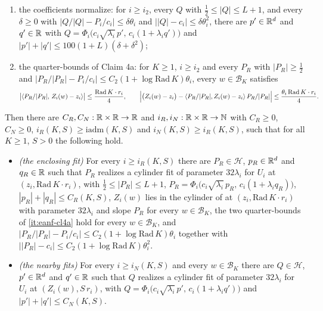 \begin{lemma}
\begin{enumerate}
$0<\rho\le\mathrm{Mof}(K,S)\,r_i$ there is $Q$ realizing a cylinder fit of
parameter $32\lambda_i$ for $U_i$ at $(Z_i(w),\rho)$ with
$\tfrac12\le|Q|\le L+1$;
\item\label{it:eanf-coeff} the coefficients normalize: for $i\ge i_2$, every
$Q$ with $\tfrac12\le|Q|\le L+1$, and every $\delta\ge0$ with
$\bigl|Q/|Q|-P_i/c_i\bigr|\le\delta\theta_i$ and
$\bigl||Q|-c_i\bigr|\le\delta\theta_i^2$, there are $p'\in\mathbb{R}^d$ and $q'\in\mathbb{R}$
with
$Q=\Phi_i\bigl(c_i\sqrt{\lambda_i}\,p',\,c_i(1+\lambda_iq')\bigr)$ and
$|p'|+|q'|\le100(1+L)(\delta+\delta^2)$;
\item\label{it:eanf-cl4a} the quarter-bounds of Claim 4a: for $K\ge1$,
$i\ge i_2$ and every $P_R$ with $|P_R|\ge\tfrac12$ and
$\bigl|P_R/|P_R|-P_i/c_i\bigr|\le C_2(1+\log\mathrm{Rad}\,K)\theta_i$, every
$w\in\mathcal B_K$ satisfies
\[
  \bigl|\langle P_R/|P_R|,\,Z_i(w)-z_i\rangle\bigr|
    \le\frac{\mathrm{Rad}\,K\cdot r_i}{4},
  \qquad
  \Bigl|\bigl(Z_i(w)-z_i\bigr)
    -\langle P_R/|P_R|,Z_i(w)-z_i\rangle\,P_R/|P_R|\Bigr|
    \le\frac{\theta_i\,\mathrm{Rad}\,K\cdot r_i}{4}.
\]
\end{enumerate}
Then there are $C_R,C_N:\mathbb{R}\times\mathbb{R}\to\mathbb{R}$ and
$i_R,i_N:\mathbb{R}\times\mathbb{R}\to\mathbb{N}$ with $C_R\ge0$, $C_N\ge0$,
$i_R(K,S)\ge\mathrm{iadm}(K,S)$ and $i_N(K,S)\ge i_R(K,S)$, such that for all
$K\ge1$, $S>0$ the following hold.
\begin{itemize}
\item\emph{(the enclosing fit)} For every $i\ge i_R(K,S)$ there are
$P_R\in\mathcal H$, $p_R\in\mathbb{R}^d$ and $q_R\in\mathbb{R}$ such that $P_R$ realizes a
cylinder fit of parameter $32\lambda_i$ for $U_i$ at
$(z_i,\mathrm{Rad}\,K\cdot r_i)$, with $\tfrac12\le|P_R|\le L+1$,
$P_R=\Phi_i\bigl(c_i\sqrt{\lambda_i}\,p_R,\,c_i(1+\lambda_iq_R)\bigr)$,
$|p_R|+|q_R|\le C_R(K,S)$, $Z_i(w)$ lies in the cylinder of
 at $(z_i,\mathrm{Rad}\,K\cdot r_i)$ with parameter
$32\lambda_i$ and slope $P_R$ for every $w\in\mathcal B_K$, the two
quarter-bounds of \ref{it:eanf-cl4a} hold for every $w\in\mathcal B_K$, and
$\bigl|P_R/|P_R|-P_i/c_i\bigr|\le C_2(1+\log\mathrm{Rad}\,K)\theta_i$ together
with $\bigl||P_R|-c_i\bigr|\le C_2(1+\log\mathrm{Rad}\,K)\theta_i^2$.
\item\emph{(the nearby fits)} For every $i\ge i_N(K,S)$ and every
$w\in\mathcal B_K$ there are $Q\in\mathcal H$, $p'\in\mathbb{R}^d$ and $q'\in\mathbb{R}$ such
that $Q$ realizes a cylinder fit of parameter $32\lambda_i$ for $U_i$ at
$(Z_i(w),S\,r_i)$, with
$Q=\Phi_i\bigl(c_i\sqrt{\lambda_i}\,p',\,c_i(1+\lambda_iq')\bigr)$ and
$|p'|+|q'|\le C_N(K,S)$.
\end{itemize}
\end{lemma}
